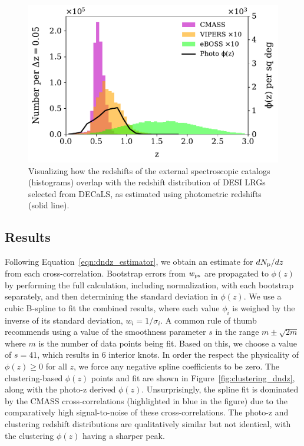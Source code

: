 \documentclass[a4paper,usenatbib]{mnras}
\begin{document}
\begin{figure}
\centering
\includegraphics[width=\linewidth]{figures/spectro_overlapping_z.pdf}
\caption{Visualizing how the redshifts of the external spectroscopic catalogs (histograms) overlap with the redshift distribution of DESI LRGs selected from DECaLS, as estimated using photometric redshifts (solid line).}
\label{fig:spectro_overlap}
\end{figure}

\subsection{Results}

Following Equation~\ref{eqn:dndz_estimator}, we obtain an estimate for $dN_{\rm p}/dz$ from each cross-correlation. Bootstrap errors from $w_{\rm ps}$ are propagated to $\phi(z)$ by performing the full calculation, including normalization, with each bootstrap separately, and then determining the standard deviation in $\phi(z)$. We use a cubic B-spline to fit the combined results, where each value $\phi_i$ is weighed by the inverse of its standard deviation, $w_i = 1/\sigma_i$. 
A common rule of thumb recommends using a value of the smoothness parameter $s$ in the range $m \pm \sqrt{2m}$ where $m$ is the number of data points being fit. Based on this, we choose a value of $s = 41$, which results in 6 interior knots. In order the respect the physicality of $\phi(z) \ge 0$ for all $z$, we force any negative spline coefficients to be zero. The clustering-based $\phi(z)$ points and fit are shown in Figure~\ref{fig:clustering_dndz}, along with the photo-z derived $\phi(z)$. Unsurprisingly, the spline fit is dominated by the CMASS cross-correlations (highlighted in blue in the figure) due to the comparatively high signal-to-noise of these cross-correlations. The photo-z and clustering redshift distributions are qualitatively similar but not identical, with the clustering $\phi(z)$ having a sharper peak.
\end{document}
